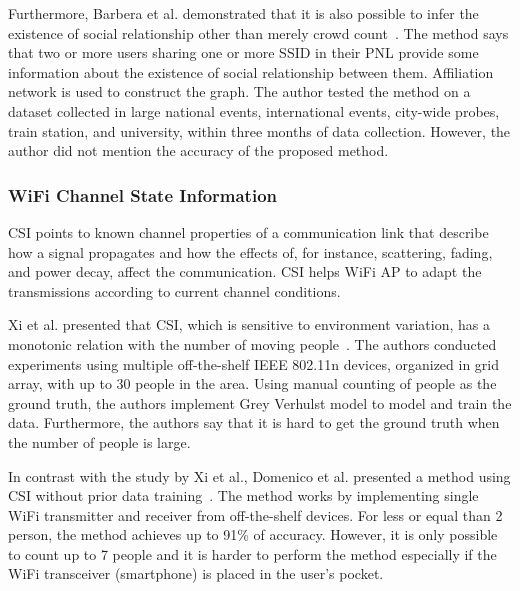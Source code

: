 	Furthermore, Barbera et al. demonstrated that it is also possible to infer the existence of social relationship other than merely crowd count~\cite{thesis014}. The method says that two or more users sharing one or more \ac{SSID} in their \ac{PNL} provide some information about the existence of social relationship between them. Affiliation network is used to construct the graph. The author tested the method on a dataset collected in large national events, international events, city-wide probes, train station, and university, within three months of data collection. However, the author did not mention the accuracy of the proposed method.

	

	
	\subsubsection{WiFi Channel State Information} %
	\label{ssub:wifi_channel_state_information}
	\ac{CSI} points to known channel properties of a communication link that describe how a signal propagates and how the effects of, for instance, scattering, fading, and power decay, affect the communication. \ac{CSI} helps WiFi \ac{AP} to adapt the transmissions according to current channel conditions.

	Xi et al. presented that \ac{CSI}, which is sensitive to environment variation, has a monotonic relation with the number of moving people~\cite{thesis006}. The authors conducted experiments using multiple off-the-shelf IEEE 802.11n devices, organized in grid array, with up to 30 people in the area. Using manual counting of people as the ground truth, the authors implement Grey Verhulst model to model and train the data. Furthermore, the authors say that it is hard to get the ground truth when the number of people is large.

	In contrast with the study by Xi et al., Domenico et al. presented a method using \ac{CSI} without prior data training~\cite{thesis051}. The method works by implementing single WiFi transmitter and receiver from off-the-shelf devices. For less or equal than 2 person, the method achieves up to 91\% of accuracy. However, it is only possible to count up to 7 people and it is harder to perform the method especially if the WiFi transceiver (smartphone) is placed in the user's pocket.

	

